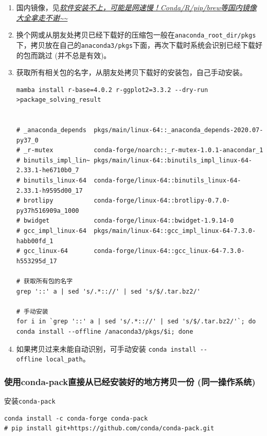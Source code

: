 \documentclass[]{article}
\numberwithin{figure}{section}
\numberwithin{table}{section}
\begin{document}
\begin{enumerate}
\def\labelenumi{\arabic{enumi}.}
\item
  国内镜像，见\emph{\href{https://mp.weixin.qq.com/s/eIw-k6RcR5KQFbrNmBsWBw}{软件安装不上，可能是网速慢！Conda/R/pip/brew等国内镜像大全拿走不谢\textasciitilde\textasciitilde{}}}
\item
  换个网或从朋友处拷贝已经下载好的压缩包一般在\texttt{anaconda\_root\_dir/pkgs}下，拷贝放在自己的\texttt{anaconda3/pkgs}下面，再次下载时系统会识别已经下载好的包而跳过 (并不总是有效)。
\item
  获取所有相关包的名字，从朋友处拷贝下载好的安装包，自己手动安装。

\begin{verbatim}
mamba install r-base=4.0.2 r-ggplot2=3.3.2 --dry-run >package_solving_result


# _anaconda_depends  pkgs/main/linux-64::_anaconda_depends-2020.07-py37_0
# _r-mutex           conda-forge/noarch::_r-mutex-1.0.1-anacondar_1
# binutils_impl_lin~ pkgs/main/linux-64::binutils_impl_linux-64-2.33.1-he6710b0_7
# binutils_linux-64  conda-forge/linux-64::binutils_linux-64-2.33.1-h9595d00_17
# brotlipy           conda-forge/linux-64::brotlipy-0.7.0-py37h516909a_1000
# bwidget            conda-forge/linux-64::bwidget-1.9.14-0
# gcc_impl_linux-64  pkgs/main/linux-64::gcc_impl_linux-64-7.3.0-habb00fd_1
# gcc_linux-64       conda-forge/linux-64::gcc_linux-64-7.3.0-h553295d_17

# 获取所有包的名字
grep '::' a | sed 's/.*:://' | sed 's/$/.tar.bz2/'

# 手动安装
for i in `grep '::' a | sed 's/.*:://' | sed 's/$/.tar.bz2/'`; do conda install --offline /anaconda3/pkgs/$i; done
\end{verbatim}
\item
  如果拷贝过来未能自动识别，可手动安装 \texttt{conda\ install\ -\/-offline\ local\_path}。
\end{enumerate}

\hypertarget{conda_pack}{%
\subsubsection{使用conda-pack直接从已经安装好的地方拷贝一份 (同一操作系统)}\label{conda_pack}}

安装\texttt{conda-pack}

\begin{verbatim}
conda install -c conda-forge conda-pack
# pip install git+https://github.com/conda/conda-pack.git
\end{verbatim}
\end{document}
